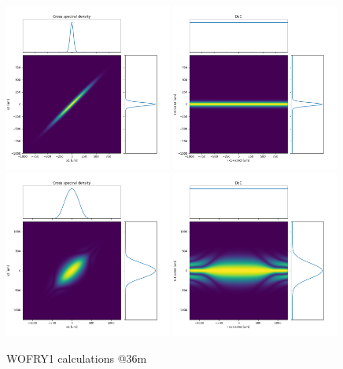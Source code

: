 \documentclass{iucr}              %
\begin{document}
\begin{figure}
    \label{fig:CSD_SRW_source}
    \includegraphics[width=0.49\textwidth]{figures/WOFRY1_CSD_36m_h.png}
    \includegraphics[width=0.49\textwidth]{figures/WOFRY1_CSD2_36m_h.png}
    \includegraphics[width=0.49\textwidth]{figures/WOFRY1_CSD_36m_v.png}
    \includegraphics[width=0.49\textwidth]{figures/WOFRY1_CSD2_36m_v.png}
    \caption{WOFRY1 calculations @36m}
\end{figure}
\end{document}

